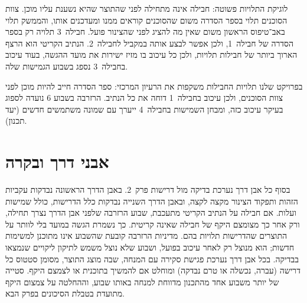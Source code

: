 לוגיקת התלויות פשוטה: חבילה אינה מתחילה לפני שהתוצר שהיא נשענת עליו מוכן. צוות הסוכנים תלוי בספר הסדרה משום שהסוכנים קוראים ממנו ומעדכנים אותו, והממשק תלוי באב־טיפוס הראשון משום שאין מה להציג לפני שהצינור פועל. חבילה~3 תלויה רק בספר הסדרה של חבילה~1, ולכן אפשר לבצע אותה במקביל לחבילה~2. הנתיב הקריטי הוא הרצף הארוך ביותר של חבילות תלויות, ולכן כל עיכוב בו מזיז ישירות את מועד ההגשה, בעוד עיכוב בחבילה~3 נספג בשבוע הגמישות שלה.

\begin{directornote}
  בפרויקט שלנו תלויות החבילות משקפות את הרעיון המרכזי: ספר הסדרה חייב להיות מוכן לפני צוות הסוכנים, ולכן עיכוב בחבילה~1 דוחה את כל הנתיב. הרזרבה בשבוע 6 נועדה לספוג בעיקר עיכוב כזה, ומבחן השמישות בחבילה~4 ייערך עם שמונה משתמשים חדשים (יעד תכנון).
\end{directornote}

\section{אבני דרך ובקרה}
בסוף כל אבן דרך נערכת בדיקה מול דרישות פרק~2. באבן הדרך הראשונה נבדקות עקביות הזהות ותפקוד הצינור מקצה לקצה, ובאבן הדרך השנייה נבדקות כלל הדרישות, כולל שמישות ועלות. אם חבילה על הנתיב הקריטי מתעכבת, שבוע הרזרבה שלפני אבן הדרך נצרך תחילה, ורק אחר כך מצומצם היקף של חבילה שאינה קריטית. כך נשמרת הגשה במועד בלי לוותר על התוצרים שהדרישות תלויות בהם. מדיניות הרזרבה קובעת שהשבוע אינו מתוכנן למשימות חדשות; הוא מנוצל רק לאחר עיכוב בפועל, ושבוע שלא נוצל משמש לתיקון ליקויים שנמצאו בבדיקה. בכל אבן דרך נערכת פגישת סקירה עם המנחה, שבה מוצג התוצר, מסומן סטטוס כל דרישה (עברה, נכשלה או טרם נבדקה) ומוחלט אם להמשיך בתוכנית או לצמצם היקף. סטייה של יותר משבוע אחד מהתכנון מדווחת למנחה באותו שבוע, וההחלטה על צמצום היקף מתועדת בטבלת הסיכונים בפרק הבא.
